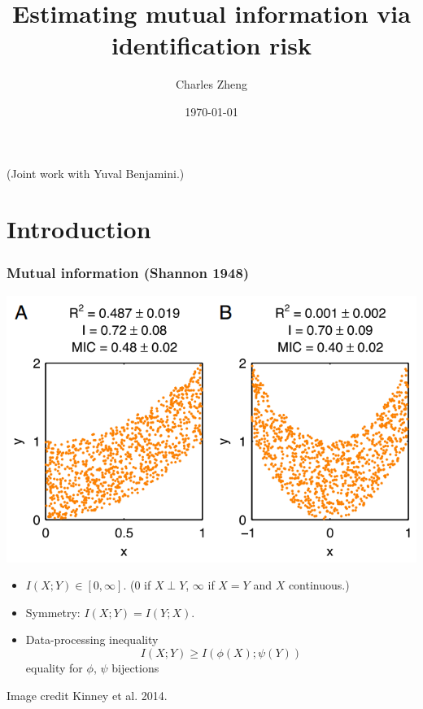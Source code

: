 \documentclass{beamer}
\title[Mutual information]{Estimating mutual information via identification risk}
\author{Charles Zheng} %
\institute[Stanford] %
{Stanford University}
\date{\today} %
\begin{document}
\begin{frame}
\titlepage %
(Joint work with Yuval Benjamini.)
\end{frame}


\section{Introduction}

\begin{frame}
\frametitle{Mutual information (Shannon 1948)}
\begin{center}
\includegraphics[scale = 0.2]{kinney.png}
\end{center}
\begin{itemize}
\item $I(X;Y) \in [0,\infty]$.  (0 if $X \perp Y$, $\infty$ if $X=Y$ and $X$ continuous.)
\item Symmetry: $I(X;Y) = I(Y; X)$.
\item Data-processing inequality
\[I(X; Y) \geq I(\phi(X); \psi(Y))\]
equality for $\phi$, $\psi$ bijections
\end{itemize}
\tiny{Image credit Kinney et al. 2014.}
\end{frame}
\end{document}
